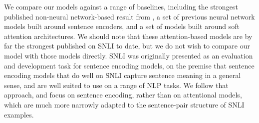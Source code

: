 \documentclass[11pt,letterpaper]{article}
\begin{document}
We compare our models against a range of baselines, including the strongest published non-neural network-based result from \cite{snli:emnlp2015}, a set of previous neural network models built around sentence encoders, and a set of models built around soft attention architectures. We should note that these attention-based models are by far the strongest published on SNLI to date, but we do not wish to compare our model with those models directly. SNLI was originally presented as an evaluation and development task for sentence encoding models, on the premise that sentence encoding models that do well on SNLI capture sentence meaning in a general sense, and are well suited to use on a range of NLP tasks. We follow that approach, and focus on sentence encoding, rather than on attentional models, which are much more narrowly adapted to the sentence-pair structure of SNLI examples.
\end{document}
